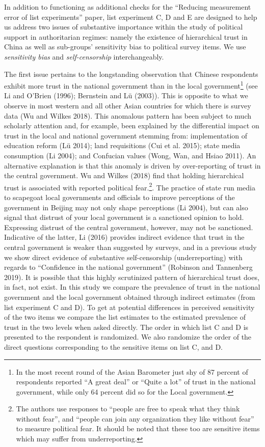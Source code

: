 \documentclass[]{article}
\let\rmarkdownfootnote\footnote%
\def\footnote{\protect\rmarkdownfootnote}
\begin{document}
In addition to functioning as additional checks for the ``Reducing
measurement error of list experiments'' paper, list experiment C, D and
E are designed to help us address two issues of substantive importance
within the study of political support in authoritarian regimes: namely
the existence of hierarchical trust in China as well as sub-groups'
sensitivity bias to political survey items. We use \emph{sensitivity
bias} and \emph{self-censorship} interchangeably.

The first issue pertains to the longstanding observation that Chinese
respondents exhibit more trust in the national government than in the
local government\footnote{In the most recent round of the Asian
  Barometer just shy of 87 percent of respondents reported ``A great
  deal'' or ``Quite a lot'' of trust in the national government, while
  only 64 percent did so for the Local government.} (see Li and O'Brien
(1996); Bernstein and Lü (2003)). This is opposite to what we observe in
most western and all other Asian countries for which there is survey
data (Wu and Wilkes 2018). This anomalous pattern has been subject to
much scholarly attention and, for example, been explained by the
differential impact on trust in the local and national government
stemming from: implementation of education reform (Lü 2014); land
requisitions (Cui et al. 2015); state media consumption (Li 2004); and
Confucian values (Wong, Wan, and Hsiao 2011). An alternative explanation
is that this anomaly is driven by over-reporting of trust in the central
government. Wu and Wilkes (2018) find that holding hierarchical trust is
associated with reported political fear.\footnote{The authors use
  responses to ``people are free to speak what they think without
  fear'', and ``people can join any organization they like without
  fear'' to measure political fear. It should be noted that these too
  are sensitive items which may suffer from underreporting.}. The
practice of state run media to scapegoat local governments and officials
to improve perceptions of the government in Beijing may not only shape
perceptions (Li 2004), but can also signal that distrust of your local
government is a sanctioned opinion to hold. Expressing distrust of the
central government, however, may not be sanctioned. Indicative of the
latter, Li (2016) provides indirect evidence that trust in the central
government is weaker than suggested by surveys, and in a previous study
we show direct evidence of substantive self-censorship (underreporting)
with regards to ``Confidence in the national government'' (Robinson and
Tannenberg 2019). It is possible that this highly scrutinized pattern of
hierarchical trust does, in fact, not exist. In this study we compare
the prevalence of trust in the national government and the local
government obtained through indirect estimates (from list experiment C
and D). To get at potential differences in perceived sensitivity of the
two items we compare the list estimates to the estimated prevalence of
trust in the two levels when asked directly. The order in which list C
and D is presented to the respondent is randomized. We also randomize
the order of the direct questions corresponding to the sensitive items
on list C, and D.
\end{document}
